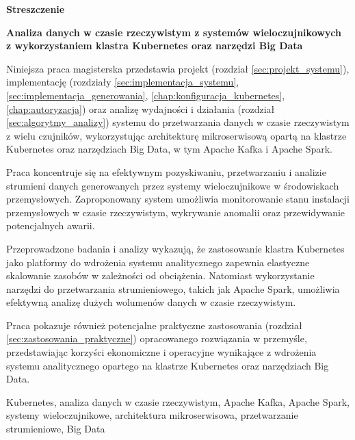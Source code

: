 \begin{abstract_pl}
\begin{center}
\textbf{\large Streszczenie}
\end{center}

\begin{center}
 \textbf{Analiza danych w czasie rzeczywistym z systemów wieloczujnikowych \\ z wykorzystaniem klastra Kubernetes oraz narzędzi Big Data}\\
\end{center}

Niniejsza praca magisterska przedstawia projekt (rozdział \ref{sec:projekt_systemu}), implementację (rozdziały \ref{sec:implementacja_systemu}, \ref{sec:implementacja_generowania}, \ref{chap:konfiguracja_kubernetes}, \ref{chap:autoryzacja}) oraz analizę wydajności i działania (rozdział \ref{sec:algorytmy_analizy}) systemu do przetwarzania danych w czasie rzeczywistym z wielu czujników, wykorzystując architekturę mikroserwisową opartą na klastrze Kubernetes oraz narzędziach Big Data, w tym Apache Kafka i Apache Spark.

Praca koncentruje się na efektywnym pozyskiwaniu, przetwarzaniu i analizie strumieni danych generowanych przez systemy wieloczujnikowe w środowiskach przemysłowych. Zaproponowany system umożliwia monitorowanie stanu instalacji przemysłowych w czasie rzeczywistym, wykrywanie anomalii oraz przewidywanie potencjalnych awarii.

Przeprowadzone badania i analizy wykazują, że zastosowanie klastra Kubernetes jako platformy do wdrożenia systemu analitycznego zapewnia elastyczne skalowanie zasobów w zależności od obciążenia. Natomiast wykorzystanie narzędzi do przetwarzania strumieniowego, takich jak Apache Spark, umożliwia efektywną analizę dużych wolumenów danych w czasie rzeczywistym.

Praca pokazuje również potencjalne praktyczne zastosowania (rozdział \ref{sec:zastosowania_praktyczne}) opracowanego rozwiązania w przemyśle, przedstawiając korzyści ekonomiczne i operacyjne wynikające z wdrożenia systemu analitycznego opartego na klastrze Kubernetes oraz narzędziach Big Data.

\begin{keywords}
Kubernetes, analiza danych w czasie rzeczywistym, Apache Kafka, Apache Spark, systemy wieloczujnikowe, architektura mikroserwisowa, przetwarzanie strumieniowe, Big Data
\end{keywords}
\end{abstract_pl}